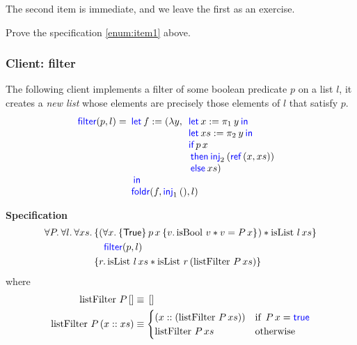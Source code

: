 The second item is immediate, and we leave the first as an exercise.
\begin{exercise}
Prove the specification \eqref{enum:item1} above.
\end{exercise}



\subsubsection*{Client: filter}
The following client implements a filter of some boolean predicate $p$ on a list $l$, \ie{} it creates a \emph{new list} whose elements are precisely those elements of $l$ that satisfy $p$.
\begin{displaymath}
    {\langkw{filter} (p, l) =}
    \begin{array}[t]{l}
      \Let f = (\lambda y, \begin{array}[t]{l}
                             \Let x = \Proj{1}  y in\\
                             \Let xs = \Proj{2} y  in\\
                             \If {p\, x} \\
                             then \Inj{2} (\Ref (x, xs) ) \\
                             \Else  xs
                             )
                           \end{array}\\
      in \\
      \langkw{foldr}(f, \Inj{1}(), l)
    \end{array}
  \end{displaymath}
  
 \noindent \textbf{Specification}
\begin{align*}
\All P. \All l. \All xs. 
\hoareV[t]{ \left( \All x. \hoare{\TRUE}{p \, x}{v. \operatorname{isBool} \, v \ast v = P \, x}\right)
\ast \operatorname{isList} \, l\, xs }{\langkw{filter}(p, l)}{r.  \operatorname{isList} \, l\, xs \ast \operatorname{isList} \, r \left( \operatorname{listFilter} \, P \, xs \right)}
\end{align*}
where
\begin{align*}
\operatorname{listFilter} \, P \, [] &\equiv \, [] \\
\operatorname{listFilter} \, P \, (x :: xs) &\equiv \begin{cases} \left( x :: \left( \operatorname{listFilter} \, P \, xs \right) \right)
													  & \text{if } \, P \, x = \textsf{\color{blue} true}  \\
\operatorname{listFilter} \, P \, xs  & \text{otherwise } \end{cases}
\end{align*}

